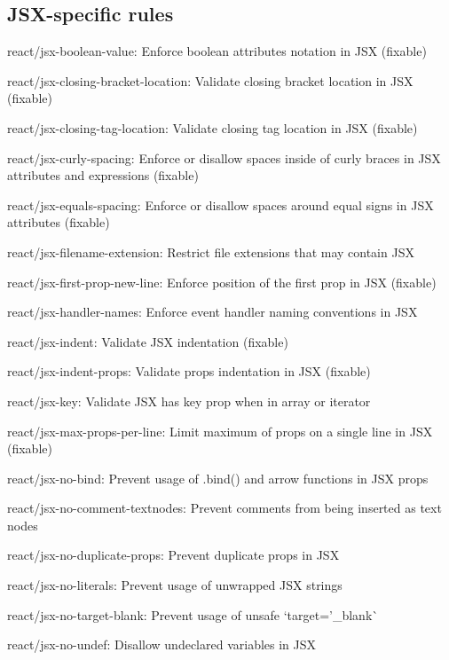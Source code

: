 \subsection*{J\+S\+X-\/specific rules}


\begin{DoxyItemize}
\item react/jsx-\/boolean-\/value\+: Enforce boolean attributes notation in J\+SX (fixable)
\item react/jsx-\/closing-\/bracket-\/location\+: Validate closing bracket location in J\+SX (fixable)
\item react/jsx-\/closing-\/tag-\/location\+: Validate closing tag location in J\+SX (fixable)
\item react/jsx-\/curly-\/spacing\+: Enforce or disallow spaces inside of curly braces in J\+SX attributes and expressions (fixable)
\item react/jsx-\/equals-\/spacing\+: Enforce or disallow spaces around equal signs in J\+SX attributes (fixable)
\item react/jsx-\/filename-\/extension\+: Restrict file extensions that may contain J\+SX
\item react/jsx-\/first-\/prop-\/new-\/line\+: Enforce position of the first prop in J\+SX (fixable)
\item react/jsx-\/handler-\/names\+: Enforce event handler naming conventions in J\+SX
\item react/jsx-\/indent\+: Validate J\+SX indentation (fixable)
\item react/jsx-\/indent-\/props\+: Validate props indentation in J\+SX (fixable)
\item react/jsx-\/key\+: Validate J\+SX has key prop when in array or iterator
\item react/jsx-\/max-\/props-\/per-\/line\+: Limit maximum of props on a single line in J\+SX (fixable)
\item react/jsx-\/no-\/bind\+: Prevent usage of {\ttfamily .bind()} and arrow functions in J\+SX props
\item react/jsx-\/no-\/comment-\/textnodes\+: Prevent comments from being inserted as text nodes
\item react/jsx-\/no-\/duplicate-\/props\+: Prevent duplicate props in J\+SX
\item react/jsx-\/no-\/literals\+: Prevent usage of unwrapped J\+SX strings
\item react/jsx-\/no-\/target-\/blank\+: Prevent usage of unsafe `target='\+\_\+blank\textquotesingle{}\`{}
\item react/jsx-\/no-\/undef\+: Disallow undeclared variables in J\+SX

\end{DoxyItemize}
